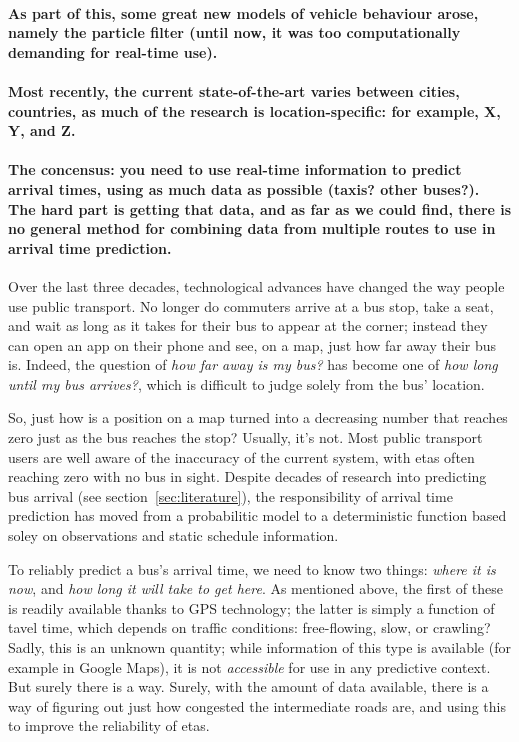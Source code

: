 \paragraph{As part of this, some great new models of vehicle behaviour arose, namely the particle filter (until now, it was too computationally demanding for real-time use).}


\paragraph{Most recently, the current state-of-the-art varies between cities, countries, as much of the research is location-specific: for example, X, Y, and Z.}


\paragraph{The concensus: you need to use real-time information to predict arrival times, using as much data as possible (taxis? other buses?). The hard part is getting that data, and as far as we could find, there is no general method for combining data from multiple routes to use in arrival time prediction.}


\pagebreak
Over the last three decades, technological advances have changed the way people use public transport.
No longer do commuters arrive at a bus stop, take a seat,
and wait as long as it takes for their bus to appear at the corner;
instead they can open an app on their phone and see, on a map,
just how far away their bus is.
Indeed, the question of \emph{how far away is my bus?}
has become one of \emph{how long until my bus arrives?},
which is difficult to judge solely from the bus' location.


So, just how is a position on a map turned into a
decreasing number that reaches zero just as the bus reaches the stop?
Usually, it's not.
Most public transport users are well aware of the inaccuracy of the current system,
with \glspl{eta} often reaching zero with no bus in sight.
Despite decades of research into predicting bus arrival (see section~\ref{sec:literature}),
the responsibility of arrival time prediction has moved from a probabilitic model
to a deterministic function based soley on observations and static schedule information.


To reliably predict a bus's arrival time,
we need to know two things:
\emph{where it is now}, and \emph{how long it will take to get here}.
As mentioned above, the first of these is readily available thanks to  GPS technology;
the latter is simply a function of tavel time,
which depends on traffic conditions: free-flowing, slow, or crawling?
Sadly, this is an unknown quantity;
while information of this type is available (for example in Google Maps),
it is not \emph{accessible} for use in any predictive context.
But surely there is a way.
Surely, with the amount of data available, there is a way of figuring out
just how congested the intermediate roads are,
and using this to improve the reliability of \glspl{eta}.



